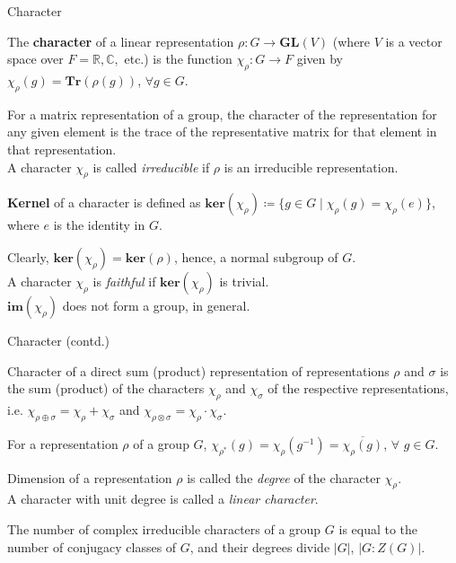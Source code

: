 \documentclass{beamer}
\newcommand\boldtext[1]{\textcolor{bolds}{\textbf{#1}}}
\newcommand\italictext[1]{\textcolor{italics}{\textit{#1}}}
\begin{document}
\begin{frame}{Character}
    \begin{definition}
        The \boldtext{character} of a linear representation $\rho:G\xrightarrow{}\mathbf{GL}(V)$ (where $V$ is a vector space over $F=\mathbb{R}, \mathbb{C},$ etc.) is the function $\chi_\rho:G\xrightarrow{}F$ given by $\chi_\rho(g)=\mathbf{Tr}(\rho(g))$, $\forall g\in G$.
    \end{definition}
    For a matrix representation of a group, the character of the representation for any given element is the trace of the representative matrix for that element in that representation.\\
    A character $\chi_\rho$ is called \italictext{irreducible} if $\rho$ is an irreducible representation.\\
    \begin{definition}
        \boldtext{Kernel} of a character is defined as $\mathbf{ker}(\chi_\rho)\coloneqq\{g\in G\mid \chi_\rho(g)=\chi_\rho(e)\}$, where $e$ is the identity in $G$.
    \end{definition}
    Clearly, $\mathbf{ker}(\chi_\rho)=\mathbf{ker}(\rho)$, hence, a normal subgroup of $G$.\\
    A character $\chi_\rho$ is \italictext{faithful} if $\mathbf{ker}(\chi_\rho)$ is trivial.\\
    $\mathbf{im}(\chi_\rho)$ does not form a group, in general.
\end{frame}

\begin{frame}{Character (contd.)}
    \begin{theorem}
        Character of a direct sum (product) representation of representations $\rho$ and $\sigma$ is the sum (product) of the characters $\chi_\rho$ and $\chi_\sigma$ of the respective representations, i.e. $\chi_{\rho\oplus\sigma}=\chi_\rho+\chi_\sigma$ and $\chi_{\rho\otimes\sigma}=\chi_\rho\cdot\chi_\sigma$.
    \end{theorem}
    \begin{theorem}
        For a representation $\rho$ of a group $G$, $\chi_{\rho^*}(g)=\chi_{\rho}(g^{-1})=\overline{\chi_{\rho}(g)}$, $\forall$ $g\in G$.
    \end{theorem}
    Dimension of a representation $\rho$ is called the \italictext{degree} of the character $\chi_\rho$.\\
    A character with unit degree is called a \italictext{linear character}.
    \begin{theorem}
         The number of complex irreducible characters of a group $G$ is equal to the number of conjugacy classes of $G$, and their degrees divide $\lvert G\rvert$, $\lvert G:Z(G)\rvert$.
    \end{theorem}
\end{frame}
\end{document}
